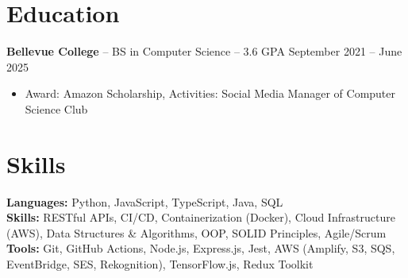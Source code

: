\documentclass[11pt]{article}
\begin{document}
\vspace{-18.5pt}

\section*{Education}
\textbf{Bellevue College} -- BS in Computer Science -- 3.6 GPA \hfill September 2021 -- June 2025\\
\vspace{-9pt}
\begin{itemize}
  \item Award: Amazon Scholarship, Activities: Social Media Manager of Computer Science Club
\end{itemize}

\vspace{-18.5pt}

\section*{Skills}
\textbf{Languages:} Python, JavaScript, TypeScript, Java, SQL\\
\textbf{Skills:} RESTful APIs, CI/CD, Containerization (Docker), Cloud Infrastructure (AWS), Data Structures \& Algorithms, OOP, SOLID Principles, Agile/Scrum\\
\textbf{Tools:} Git, GitHub Actions, Node.js, Express.js, Jest, AWS (Amplify, S3, SQS, EventBridge, SES, Rekognition), TensorFlow.js, Redux Toolkit

\vspace{-6.5pt}
\end{document}
